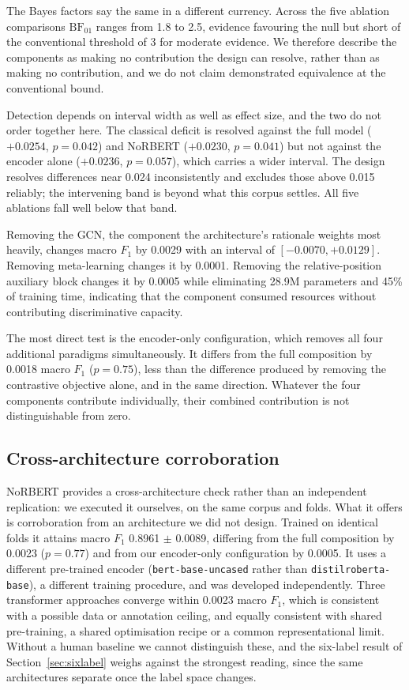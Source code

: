 \documentclass[11pt,a4paper]{article}
\begin{document}
The Bayes factors say the same in a different currency. Across the five ablation comparisons
$\mathrm{BF}_{01}$ ranges from 1.8 to 2.5, evidence favouring the null but short of the
conventional threshold of 3 for moderate evidence. We therefore describe the components as
making no contribution the design can resolve, rather than as making no contribution, and we
do not claim demonstrated equivalence at the conventional bound.

Detection depends on interval width as well as effect size, and the two do not order together
here. The classical deficit is resolved against the full model ($+0.0254$, $p = 0.042$) and
NoRBERT ($+0.0230$, $p = 0.041$) but not against the encoder alone ($+0.0236$, $p = 0.057$),
which carries a wider interval. The design resolves differences near 0.024 inconsistently and excludes those above 0.015 reliably; the
intervening band is beyond what this corpus settles. All five ablations fall well below that band.

Removing the GCN, the component the architecture's rationale weights most heavily,
changes macro $F_1$ by 0.0029 with an interval of $[-0.0070, +0.0129]$. Removing
meta-learning changes it by 0.0001. Removing the relative-position auxiliary block changes it by
0.0005 while eliminating 28.9M parameters and 45\% of training time, indicating that the
component consumed resources without contributing discriminative capacity.

The most direct test is the encoder-only configuration, which removes all four additional
paradigms simultaneously. It differs from the full composition by 0.0018 macro $F_1$ ($p = 0.75$), less than the difference produced by removing the contrastive objective alone, and in the same direction. Whatever the four components contribute individually,
their combined contribution is not distinguishable from zero.

\subsection{Cross-architecture corroboration}
\label{sec:norbert}

NoRBERT provides a cross-architecture check rather than an independent replication: we executed
it ourselves, on the same corpus and folds. What it offers is corroboration from an architecture
we did not design. Trained on identical folds it
attains macro $F_1$ 0.8961 $\pm$ 0.0089, differing from the full composition by 0.0023
($p = 0.77$) and from our encoder-only configuration by 0.0005. It uses a different
pre-trained encoder (\texttt{bert-base-uncased} rather than
\texttt{distilroberta-base}), a different training procedure, and was developed
independently. Three transformer approaches converge within 0.0023 macro $F_1$, which is consistent with a possible data
or annotation ceiling, and equally consistent with shared pre-training, a shared optimisation recipe or a
common representational limit. Without a human baseline we cannot distinguish these, and the six-label
result of Section~\ref{sec:sixlabel} weighs against the strongest reading, since the same architectures
separate once the label space changes.
\end{document}
